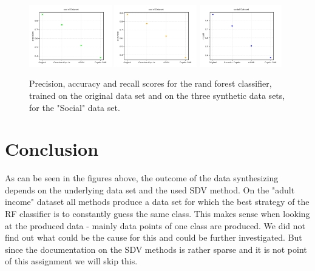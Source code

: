 \documentclass{article}
\begin{document}
\begin{figure}[h!]
	\centering
	\includegraphics[width=0.32\textwidth]{../plots/results/social_precision.png}
	\includegraphics[width=0.32\textwidth]{../plots/results/social_accuracy.png}
	\includegraphics[width=0.32\textwidth]{../plots/results/social_recall.png}

	\caption{Precision, accuracy and recall scores for the rand forest classifier, trained on the original data set and on the three synthetic data sets, for the "Social" data set.}
	\label{scores_social}
\end{figure}




\clearpage
\section{Conclusion}

As can be seen in the figures above, the outcome of the data synthesizing depends on the underlying data set and the used SDV method. On the "adult income" dataset all methods produce a data set for which the best strategy of the RF classifier is to constantly guess the same class. This makes sense when looking at the produced data - mainly data points of one class are produced. We did not find out what could be the cause for this and could be further investigated. But since the documentation on the SDV methods is rather sparse and it is not point of this assignment we will skip this. \\
\end{document}
